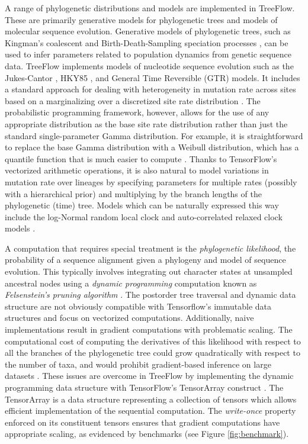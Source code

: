 A range of phylogenetic distributions and models are implemented in TreeFlow. These are primarily generative models for phylogenetic trees and models of molecular sequence evolution. Generative models of phylogenetic trees, such as Kingman's coalescent \cite{kuhner1995estimating} and Birth-Death-Sampling speciation processes \cite{stadler2009incomplete}, can be used to infer parameters related to population dynamics from genetic sequence data. TreeFlow implements models of nucleotide sequence evolution such as the Jukes-Cantor \cite{jukes1969evolution}, HKY85 \cite{hasegawa1985dating}, and General Time Reversible (GTR) \cite{tavare1986some} models. It includes a standard approach for dealing with heterogeneity in mutation rate across sites based on a marginalizing over a discretized site rate distribution \cite{yang1994maximum}. The probabilistic programming framework, however, allows for the use of any appropriate distribution as the base site rate distribution rather than just the standard single-parameter Gamma distribution. For example, it is straightforward to replace the base Gamma distribution with a Weibull distribution, which has a quantile function that is much easier to compute \cite{fourment2019evaluating}. Thanks to TensorFlow's vectorized arithmetic operations, it is also natural to model variations in mutation rate over lineages by specifying parameters for multiple rates (possibly with a hierarchical prior) and multiplying by the branch lengths of the phylogenetic (time) tree. Models which can be naturally expressed this way include the log-Normal random local clock \cite{drummond2006relaxed} and auto-correlated relaxed clock models \cite{thorne1998estimating}.

A computation that requires special treatment is the \textit{phylogenetic likelihood}, the probability of a sequence alignment given a phylogeny and model of sequence evolution. This typically involves integrating out character states at unsampled ancestral nodes using a \textit{dynamic programming} computation known as \textit{Felsenstein's pruning algorithm} \cite{felsenstein1981evolutionary}. The postorder tree traversal and dynamic data structure are not obviously compatible with Tensorflow's immutable data structures and focus on vectorized computations. Additionally, naive implementations result in gradient computations with problematic scaling. The computational cost of computing the derivatives of this likelihood with respect to all the branches of the phylogenetic tree could grow quadratically with respect to the number of taxa, and would prohibit gradient-based inference on large datasets \cite{ji2020gradients}. These issues are overcome in TreeFlow by implementing the dynamic programming data structure with TensorFlow's TensorArray construct \cite{yu2018dynamic}. The TensorArray is a data structure representing a collection of tensors which allows efficient implementation of the sequential computation. The \textit{write-once} property enforced on its constituent tensors ensures that gradient computations have appropriate scaling, as evidenced by benchmarks (see Figure \ref{fig:benchmark}).

